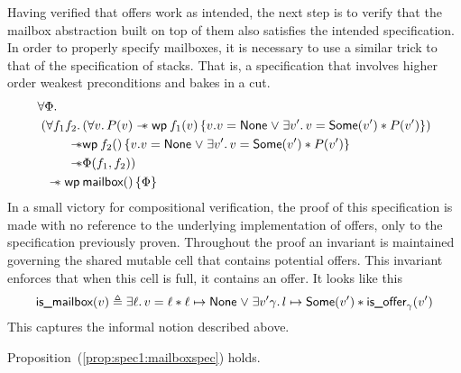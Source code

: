 Having verified that offers work as intended, the next step is to
verify that the mailbox abstraction built on top of them also
satisfies the intended specification. In order to properly specify
mailboxes, it is necessary to use a similar trick to that of the
specification of stacks. That is, a specification that involves higher
order weakest preconditions and bakes in a cut.
\begin{align}
  \forall \Phi.\qquad& \label{prop:spec1:mailboxspec}\\
  (\All f_1 f_2.&
        (\All v. P(v) \wand \wpre{f_1(v)}{v. v = \textlog{None} \mathrel{\vee} \Exists v'. v = \textlog{Some}(v') * P(v')})
                  \nonumber\\
  \wand & \wpre{f_2()}{v. v = \textlog{None} \mathrel{\vee} \Exists v'. v = \textlog{Some}(v') * P(v')}
          \nonumber\\
  \wand & \Phi(f_1, f_2)) \nonumber\\
  \wand \wpre{&\textlog{mailbox}()}{\Phi} \nonumber
\end{align}
In a small victory for compositional verification, the proof of this
specification is made with no reference to the underlying
implementation of offers, only to the specification previously
proven. Throughout the proof an invariant is maintained governing the
shared mutable cell that contains potential offers. This invariant
enforces that when this cell is full, it contains an offer. It looks
like this
\[
  \textlog{is\_mailbox}(v) \triangleq
  \Exists \ell. v = \ell *
  \ell \mapsto \textlog{None} \mathrel{\vee}
  \Exists v' \gamma. l \mapsto \textlog{Some}(v') * \textlog{is\_offer}_\gamma(v')
\]
This captures the informal notion described above.
\begin{thm}
  Proposition~(\ref{prop:spec1:mailboxspec}) holds.
\end{thm}
